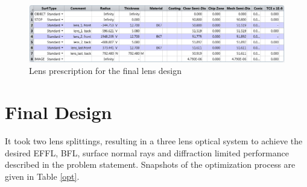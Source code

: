 \documentclass[10pt]{article}
\begin{document}
\begin{figure}[h!]
	\centering
	\includegraphics[width=0.75\linewidth]{../zemax/3_threeElement/2_optimize_RMS/lens}
	\caption{Lens prescription for the final lens design}
\end{figure}

\section{Final Design}

It took two lens splittings, resulting in a three lens optical system to achieve the desired EFFL, BFL, surface normal rays and diffraction limited performance described in the problem statement. Snapshots of the optimization process are given in Table \ref{opt}.
\end{document}
